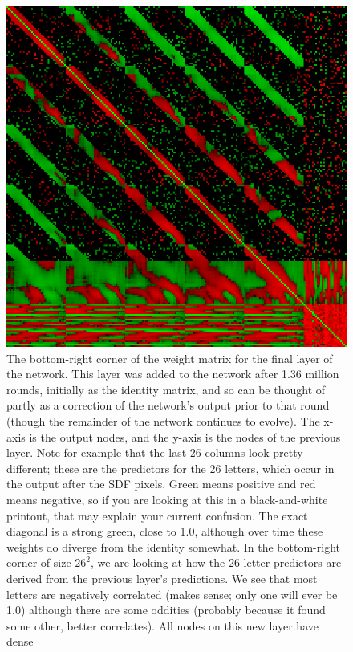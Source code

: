 \documentclass[twocolumn]{article}
\begin{document}
\begin{figure}[ht!b]
\centering
  \includegraphics[width=0.99 \linewidth]{lastlayer}
  \caption{ The bottom-right corner of the weight matrix for the final
    layer of the network. This layer was added to the network after
    1.36 million rounds, initially as the identity matrix, and so can
    be thought of partly as a correction of the network's output prior
    to that round (though the remainder of the network continues to
    evolve). The x-axis is the output nodes, and the y-axis is the
    nodes of the previous layer. Note for example that the last 26
    columns look pretty different; these are the predictors for the 26
    letters, which occur in the output after the SDF pixels. Green
    means positive and red means negative, so if you are looking at
    this in a black-and-white printout, that may explain your current
    confusion. The exact diagonal is a strong green, close to 1.0,
    although over time these weights do diverge from the identity
    somewhat. In the bottom-right corner of size $26^2$, we are
    looking at how the 26 letter predictors are derived from the
    previous layer's predictions. We see that most letters are
    negatively correlated (makes sense; only one will ever be 1.0)
    although there are some oddities (probably because it found some
    other, better correlates). All nodes on this new layer have dense
}
\end{figure}
\end{document}
